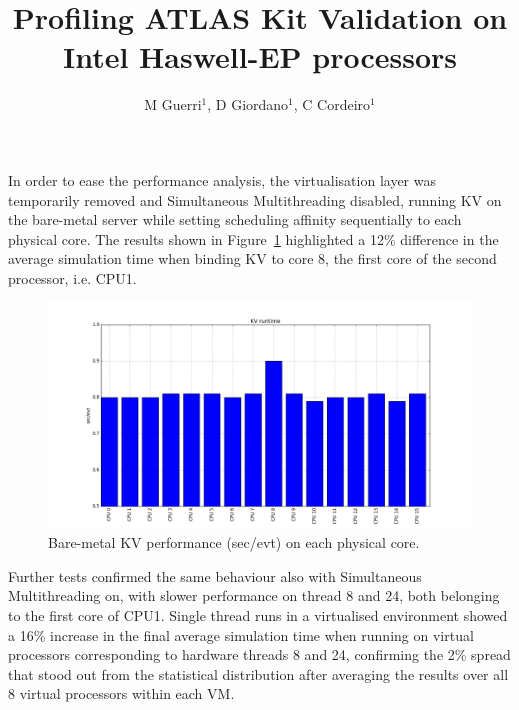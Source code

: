\documentclass[a4paper]{jpconf}
\begin{document}
\title{Profiling ATLAS Kit Validation on \newline Intel Haswell-EP processors}

\author{M Guerri$^1$, D Giordano$^1$, C Cordeiro$^1$}
\address{$^1$ CERN}





In order to ease the performance analysis, the virtualisation layer was
temporarily removed and Simultaneous Multithreading disabled, running KV on 
the bare-metal server while setting scheduling affinity sequentially to each physical
core. The results shown
in Figure~\ref{kv-runtime} highlighted a 12\% difference in the average simulation
time when binding KV to core 8, the first core of the second processor, i.e. CPU1.

\begin{figure}[b]
\begin{center}
\includegraphics[scale=0.3]{images/kv_runtime.png}
\end{center}
\caption{\label{kv-runtime} Bare-metal KV performance (sec/evt) on each physical core. }
\end{figure}
Further tests confirmed the same behaviour also with Simultaneous Multithreading 
on, with slower performance on thread 8 and 24, both belonging to the first core of 
CPU1. Single thread runs in a virtualised environment showed a 16\%
increase in the final average simulation time when running on virtual processors
corresponding to hardware threads 8 and 24, confirming the 2\%
spread that stood out from the statistical distribution after averaging the results
over all 8 virtual processors within each VM. 
\end{document}
